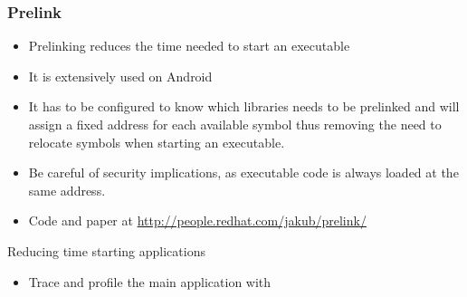 \begin{frame}
\frametitle{Prelink}
\begin{itemize}
\item Prelinking reduces the time needed to start an executable
\item It is extensively used on Android
\item It has to be configured to know which libraries needs to be
      prelinked and will assign a fixed address for each available
      symbol thus removing the need to relocate symbols when starting
      an executable.
\item Be careful of security implications, as executable code is
      always loaded at the same address.
\item Code and paper at
      \url{http://people.redhat.com/jakub/prelink/}
\end{itemize}
\end{frame}

\setuplabframe
{Reducing time starting applications}
{
\begin{itemize}
\item Trace and profile the main application with 
\end{itemize}
}

